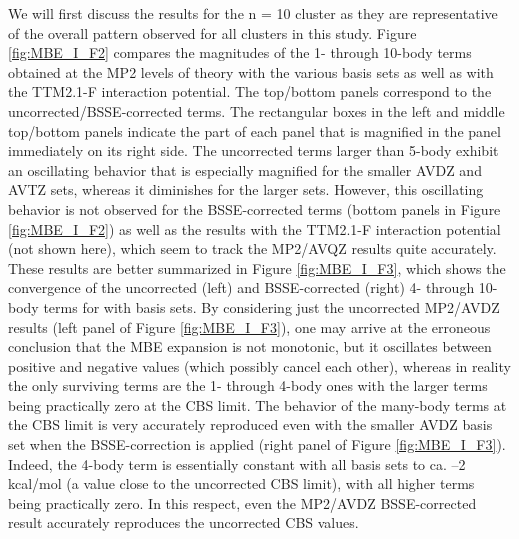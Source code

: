 \documentclass[11pt, proquest]{uwthesis}[2020/02/24]
\let\ce\ch
\begin{document}
\par We will first discuss the results for the n = 10 cluster as they are representative of the overall pattern observed for all clusters in this study. Figure \ref{fig:MBE_I_F2} compares the magnitudes of the 1- through 10-body terms obtained at the MP2 levels of theory with the various basis sets as well as with the TTM2.1-F interaction potential. The top/bottom panels correspond to the uncorrected/BSSE-corrected terms. The rectangular boxes in the left and middle top/bottom panels indicate the part of each panel that is magnified in the panel immediately on its right side. The uncorrected terms larger than 5-body exhibit an oscillating behavior that is especially magnified for the smaller AVDZ and AVTZ sets, whereas it diminishes for the larger sets. However, this oscillating behavior is not observed for the BSSE-corrected terms (bottom panels in Figure \ref{fig:MBE_I_F2}) as well as the results with the TTM2.1-F interaction potential (not shown here), which seem to track the MP2/AVQZ results quite accurately. These results are better summarized in Figure \ref{fig:MBE_I_F3}, which shows the convergence of the uncorrected (left) and BSSE-corrected (right) 4- through 10-body terms for \ce{(H2O)_{10}} with basis sets. By considering just the uncorrected MP2/AVDZ results (left panel of Figure \ref{fig:MBE_I_F3}), one may arrive at the erroneous conclusion that the MBE expansion is not monotonic, but it oscillates between positive and negative values (which possibly cancel each other), whereas in reality the only surviving terms are the 1- through 4-body ones with the larger terms being practically zero at the CBS limit. The behavior of the many-body terms at the CBS limit is very accurately reproduced even with the smaller AVDZ basis set when the BSSE-correction is applied (right panel of Figure \ref{fig:MBE_I_F3}). Indeed, the 4-body term is essentially constant with all basis sets to ca. –2 kcal/mol (a value close to the uncorrected CBS limit), with all higher terms being practically zero. In this respect, even the MP2/AVDZ BSSE-corrected result accurately reproduces the uncorrected CBS values.


\end{document}
